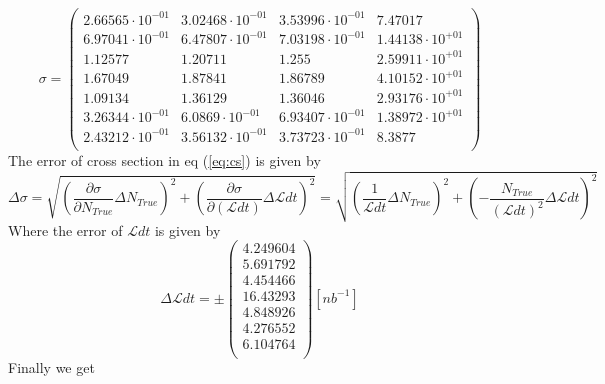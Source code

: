 \documentclass[]{article}
\begin{document}
\begin{equation}
\sigma = \begin{pmatrix}
   2.66565\cdot 10^{-01} & 3.02468\cdot 10^{-01} & 3.53996\cdot 10^{-01} & 7.47017 \\
   6.97041\cdot 10^{-01} & 6.47807\cdot 10^{-01} & 7.03198\cdot 10^{-01} & 1.44138\cdot 10^{+01} \\
   1.12577 & 1.20711 & 1.255 & 2.59911\cdot 10^{+01} \\
   1.67049 & 1.87841 & 1.86789 & 4.10152\cdot 10^{+01} \\
   1.09134 & 1.36129 & 1.36046 & 2.93176\cdot 10^{+01} \\
   3.26344\cdot 10^{-01} & 6.0869\cdot 10^{-01} & 6.93407\cdot 10^{-01} & 1.38972\cdot 10^{+01} \\
   2.43212\cdot 10^{-01} & 3.56132\cdot 10^{-01} & 3.73723\cdot 10^{-01} & 8.3877 \\
\end{pmatrix}
\end{equation}
The error of cross section in eq (\ref{eq:cs}) is given by
\begin{equation}
\Delta\sigma = \sqrt{\left(\frac{\partial\sigma}{\partial N_{True}}\Delta N_{True}\right)^2+
\left(\frac{\partial\sigma}{\partial (\mathcal{L}dt)}\Delta{\mathcal{L}dt}\right)^2} = \sqrt{\left(\frac{1}{\mathcal{L}dt}\Delta N_{True}\right)^2
+\left(-\frac{N_{True}}{(\mathcal{L}dt)^2}\Delta\mathcal{L}dt\right)^2}
\end{equation}
Where the error of $\mathcal{L}dt$ is given by
\begin{equation}
\Delta\mathcal{L}dt = \pm \begin{pmatrix}
   4.249604 \\
   5.691792 \\
   4.454466 \\
   16.43293 \\
   4.848926 \\
   4.276552 \\
   6.104764 \\
\end{pmatrix} [nb^{-1}]
\end{equation}
Finally we get
\end{document}
